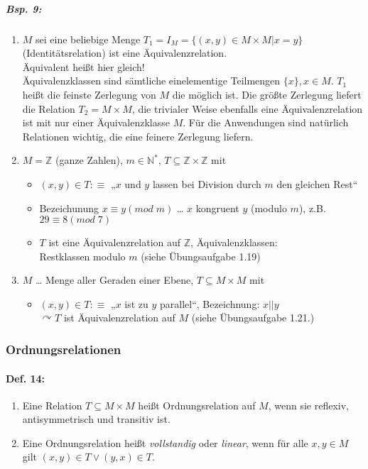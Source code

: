 \subparagraph{Bsp. 9:}
\begin{enumerate}[label=\alph*)]
\item $M$ sei eine beliebige Menge $T_1=I_M=\{ (x,y) \in M\times M | x=y\}$ (Identitätsrelation) ist eine Äquivalenzrelation.\\
Äquivalent heißt hier gleich! \\
Äquivalenzklassen sind sämtliche einelementige Teilmengen $\{x\}, x\in M$. $T_1$ heißt die feinste Zerlegung von $M$ die möglich ist. Die größte Zerlegung liefert die Relation $T_2=M\times M$, die trivialer Weise ebenfalls eine Äquivalenzrelation ist mit nur einer Äquivalenzklasse $M$. Für die Anwendungen sind natürlich Relationen wichtig, die eine feinere Zerlegung liefern.
\item $M = \mathbb{Z}$ (ganze Zahlen), $m\in \mathbb{N}^*$, $T\subseteq \mathbb{Z}\times \mathbb{Z}$ mit
\begin{itemize}
\item $(x,y) \in T : \equiv$ „$x$ und $y$ lassen bei Division durch $m$ den gleichen Rest“
\item Bezeichunung $x \equiv y (mod\; m)$ … $x$ kongruent $y$ (modulo $m$), z.B. $29 \equiv 8 (mod\; 7)$
\item $T$ ist eine Äquivalenzrelation auf $\mathbb{Z}$, Äquivalenzklassen:\\
Restklassen modulo $m$ (siehe Übungsaufgabe 1.19)
\end{itemize}
\item $M$ … Menge aller Geraden einer Ebene, $T\subseteq M \times M$ mit
\begin{itemize}
\item $(x,y) \in T :\equiv$ „$x$ ist zu $y$ parallel“, Bezeichnung: $x||y$\\
$\curvearrowright T$ ist Äquivalenzrelation auf $M$ (siehe Übungsaufgabe 1.21.)
\end{itemize}
\end{enumerate}

\subsubsection{Ordnungsrelationen} \label{subsec:Ordnungsrelationen}
\paragraph{Def. 14:}
\begin{enumerate}[label=\alph*)]
\item Eine Relation $T\subseteq M\times M$ heißt Ordnungsrelation auf $M$, wenn sie reflexiv, antisymmetrisch und transitiv ist.
\item Eine Ordnungsrelation heißt \emph{vollstandig} oder \emph{linear}, wenn für alle $x,y \in M$ gilt $(x,y)\in T \vee (y,x) \in T$.
\end{enumerate}

